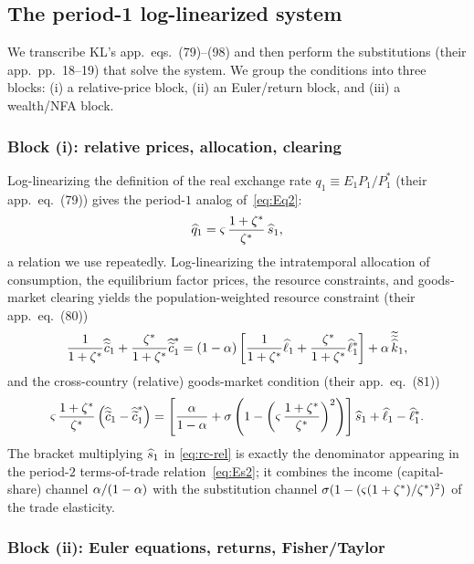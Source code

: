 \subsection{The period-1 log-linearized system}
\label{sec:engine-period1}

We transcribe KL's app.~eqs.~(79)--(98) and then perform the substitutions
(their app.~pp.~18--19) that solve the system. We group the conditions into
three blocks: (i) a relative-price block, (ii) an Euler/return block, and (iii)
a wealth/NFA block.

\subsubsection{Block (i): relative prices, allocation, clearing}

Log-linearizing the definition of the real exchange rate $q_1\equiv E_1P_1/P^{*}_1$
(their app.~eq.~(79)) gives the period-$1$ analog of~\eqref{eq:Eq2}:
\begin{equation}
\widehat{q}_1 = \varsigma\,\frac{1+\zeta^{*}}{\zeta^{*}}\,\widehat{s}_1, \label{eq:q1-s1}
\end{equation}
a relation we use repeatedly. Log-linearizing the intratemporal allocation of
consumption, the equilibrium factor prices, the resource constraints, and
goods-market clearing yields the population-weighted resource constraint (their
app.~eq.~(80))
\begin{equation}
\frac{1}{1+\zeta^{*}}\widehat{\widetilde{c}}_1 + \frac{\zeta^{*}}{1+\zeta^{*}}\widehat{\widetilde{c}}^{*}_1
= (1-\alpha)\left[\frac{1}{1+\zeta^{*}}\widehat{\ell}_1 + \frac{\zeta^{*}}{1+\zeta^{*}}\widehat{\ell}^{*}_1\right]
+ \alpha\,\widetilde{\widetilde{\widehat{k}}}_1, \label{eq:rc-agg}
\end{equation}
and the cross-country (relative) goods-market condition (their app.~eq.~(81))
\begin{equation}
\varsigma\,\frac{1+\zeta^{*}}{\zeta^{*}}\left(\widehat{\widetilde{c}}_1 - \widehat{\widetilde{c}}^{*}_1\right)
= \left[\frac{\alpha}{1-\alpha} + \sigma\left(1-\left(\varsigma\,\frac{1+\zeta^{*}}{\zeta^{*}}\right)^2\right)\right]\widehat{s}_1
+ \widehat{\ell}_1 - \widehat{\ell}^{*}_1. \label{eq:rc-rel}
\end{equation}
The bracket multiplying $\widehat{s}_1$ in \eqref{eq:rc-rel} is exactly the
denominator appearing in the period-$2$ terms-of-trade relation~\eqref{eq:Es2};
it combines the income (capital-share) channel $\alpha/(1-\alpha)$ with the
substitution channel $\sigma(1-(\varsigma(1+\zeta^{*})/\zeta^{*})^2)$ of the trade elasticity.

\subsubsection{Block (ii): Euler equations, returns, Fisher/Taylor}


